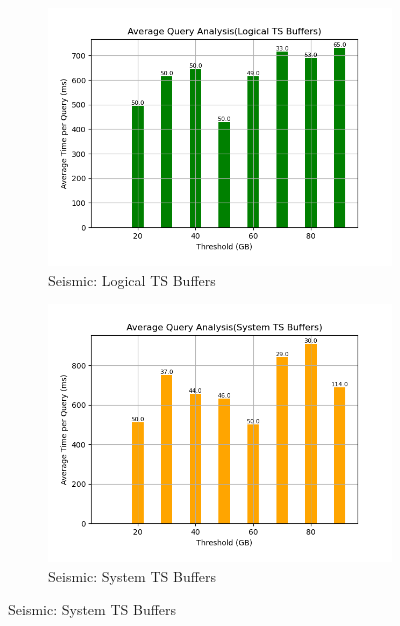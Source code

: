 \begin{figure}
	\centering
	\begin{subfigure}[c]{0.45\textwidth}
		\includegraphics[width=1\textwidth]   {figures/Experiments/Dynamic/SEISMIC/batch_answering/25/average_query_time_per_batch_version_999777015_10485760_10_delay[25].png}
		\caption{Seismic: Logical TS Buffers}
		\label{fig:logical-ts-25-seismic}
	\end{subfigure}
	\begin{subfigure}[c]{0.45\textwidth}
		\includegraphics[width=1\textwidth]	 {figures/Experiments/Dynamic/SEISMIC/batch_answering/25/average_query_time_per_batch_version_999777018_10485760_10_delay[25].png}
		\caption{Seismic: System TS Buffers}
		\label{fig:system-ts-25-seismic}

\end{subfigure}
\end{figure}
